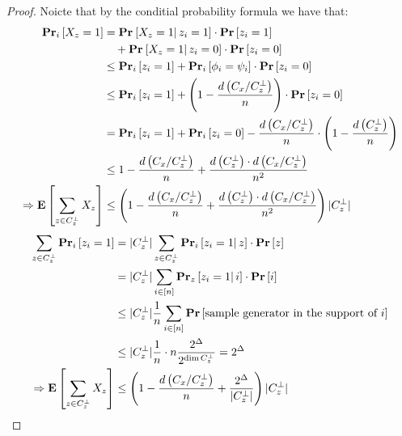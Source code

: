 \documentclass[manuscript,screen,review]{acmart}
\begin{document}
\newcommand{\dxnw}{  1 - \frac{d\left( C_{x}/C_{z}^{\perp} \right)}{n} } 
\newcommand{\dxn}{ \left( \dxnw \right)} 
\newcommand{\czp}{C_{z}^{\perp}}
\newcommand{\czpa}{|\czp |}
\newcommand{\forczp}[2]{ \sum_{#1 \in \czp}{#2} }  
\newcommand{\dismul}{  \frac{ d\left( \czp  \right) \cdot   d\left( C_{x}/C_{z}^{\perp} \right)}{n^{2} }}
\begin{proof}
  Noicte that by the conditial probability formula we have that: 
  \begin{equation*}
    \begin{split}
      \prbm{X_{z}=1}{i} &=  \prbcprb{}{X_{z}=1}{z_{i}=1}  \\ 
      & \ \ \ + \prbcprb{}{X_{z}=1}{z_{i}=0} \\ 
      & \le \prbm{z_{i}= 1 }{i} +  \prbm{\phi_{i} = \psi_{i}  }{i} \cdot \prb{z_{i}= 0 }  \\ 
      & \le \prbm{z_{i}= 1 }{i} +  \dxn \cdot \prb{z_{i}= 0 }  \\
      & = \prbm{z_{i}= 1 }{i} + \prbm{z_{i}= 0 }{i} -   \frac{d\left( C_{x}/C_{z}^{\perp} \right)}{n} \cdot \left( 1 - \frac{d\left( \czp \right)}{n}   \right) \\ 
      & \le \dxnw + \dismul \\ 
      \Rightarrow \expp{\forczp{z}{X_{z}}} & \le \left( \dxnw  + \dismul \right)\czpa  
    \end{split}
  \end{equation*}
\begin{equation*}
  \begin{split}
    \forczp{z}{\prbm{z_{i}= 1 }{i}} & = \czpa \forczp{z}{\prbcprb{i}{z_{i}= 1 }{z}} \\
    & =   \czpa \sum_{i \in [n]}{\prbcprb{z}{z_{i}= 1 }{i}} \\
    & \le \czpa \frac{1}{n} \sum_{i\in [n]}{ \prb{ \text{sample generator in the support of } i  } }\\
    & \le \czpa \frac{1}{n} \cdot n \frac{2^{\Delta}}{2^{\dim \czp}} = 2^{\Delta} \\ 
    \Rightarrow  \expp{\forczp{z}{X_{z}}}  & \le \left( \dxnw + \frac{2^{\Delta}}{\czpa}  \right)\czpa
  \end{split}
\end{equation*}

\end{proof}
\newpage 
\end{document}
